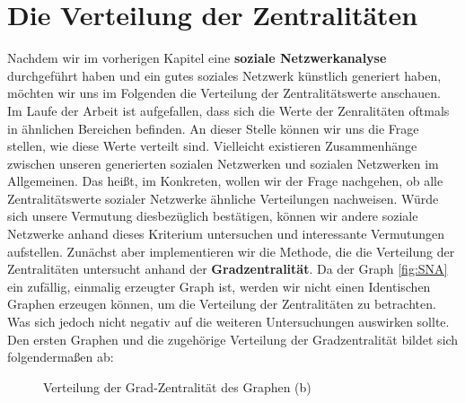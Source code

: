 \section{Die Verteilung der Zentralitäten}
Nachdem wir im vorherigen Kapitel eine \textbf{soziale Netzwerkanalyse} durchgeführt haben und ein gutes soziales Netzwerk künstlich generiert haben, möchten wir uns im Folgenden die Verteilung der Zentralitätswerte anschauen.
Im Laufe der Arbeit ist aufgefallen, dass sich die Werte der Zenralitäten oftmals in ähnlichen Bereichen befinden. An dieser Stelle können wir uns die Frage stellen, wie diese Werte verteilt sind. Vielleicht existieren Zusammenhänge zwischen unseren generierten sozialen Netzwerken und sozialen Netzwerken im Allgemeinen. Das heißt, im Konkreten, wollen wir der Frage nachgehen, ob alle Zentralitätswerte sozialer Netzwerke ähnliche Verteilungen nachweisen. Würde sich unsere Vermutung diesbezüglich bestätigen, können wir andere soziale Netzwerke anhand dieses Kriterium untersuchen und interessante Vermutungen aufstellen. Zunächst aber implementieren wir die Methode, die die Verteilung der Zentralitäten untersucht anhand der \textbf{Gradzentralität}.
Da der Graph \ref{fig:SNA} ein zufällig, einmalig erzeugter Graph ist, werden wir nicht einen Identischen Graphen erzeugen können, um die Verteilung der Zentralitäten zu betrachten. Was sich jedoch nicht negativ auf die weiteren Untersuchungen auswirken sollte. Den ersten Graphen und die zugehörige Verteilung der Gradzentralität bildet sich folgendermaßen ab: 

\FloatBarrier
\begin{figure}[h!]%
  \centering
  \qquad
  \caption{Verteilung der Grad-Zentralität des Graphen (b)}%
  \label{fig:distribution}
\end{figure}
\FloatBarrier

